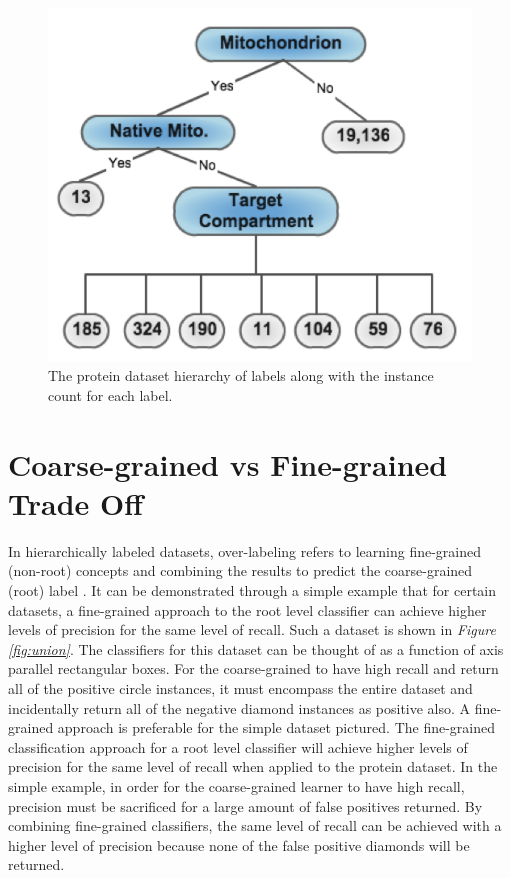 \documentclass[ms]{nuthesis}
\begin{document}
\FloatBarrier
\begin{figure}[!htb]
	\centering
    \includegraphics[width=0.75\columnwidth]{fig/Mito_tree}
    \caption{The protein dataset hierarchy of labels along with the instance
    count for each label.}
    \label{fig:Mitotree}
\end{figure}
\FloatBarrier


\section{Coarse-grained vs Fine-grained Trade Off}
\par In hierarchically labeled datasets, over-labeling refers to learning fine-grained
(non-root) concepts and combining the results to predict the coarse-grained (root) label \cite{yugi}.
 It can be demonstrated through a simple example
that for certain datasets, a fine-grained approach to the root level classifier can achieve higher
levels of precision for the same level of recall. Such a dataset is shown in \textit{Figure
\ref{fig:union}}. The classifiers for this dataset can be thought of as a function of axis parallel
rectangular boxes. For the coarse-grained to have high recall and return all of the positive
circle instances, it must encompass the entire dataset
and incidentally return all of the negative diamond instances as
positive also. A fine-grained approach is preferable for the simple dataset pictured. The
fine-grained classification approach for a root
level classifier will achieve higher levels of precision for the same level of recall when
applied to the protein dataset. In the simple example, in order for the coarse-grained
learner to have high
    recall, precision must be sacrificed for a large amount of false positives returned.
    By combining fine-grained classifiers, the same level of recall can be achieved with a
    higher level of precision because none of the false positive diamonds will be returned.
\end{document}
